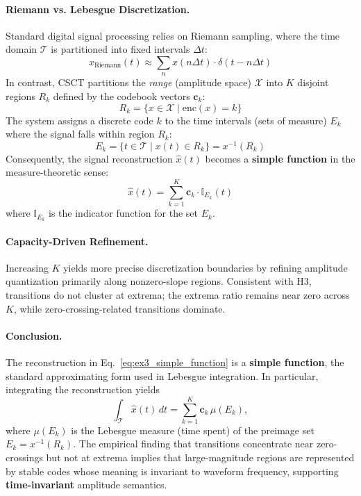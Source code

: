 \documentclass{article}
\begin{document}
\paragraph{Riemann vs. Lebesgue Discretization.}
Standard digital signal processing relies on Riemann sampling, where the time domain $\mathcal{T}$ is partitioned into fixed intervals $\Delta t$:
\begin{equation}
    x_{\text{Riemann}}(t) \approx \sum_{n} x(n\Delta t) \cdot \delta(t - n\Delta t)
\label{eq:ex3_riemann}
\end{equation}
In contrast, CSCT partitions the \textit{range} (amplitude space) $\mathcal{X}$ into $K$ disjoint regions $R_k$ defined by the codebook vectors $\mathbf{c}_k$:
\begin{equation}
    R_k = \{ x \in \mathcal{X} \mid \text{enc}(x) = k \}
\label{eq:ex3_range_partition}
\end{equation}
The system assigns a discrete code $k$ to the time intervals (sets of measure) $E_k$ where the signal falls within region $R_k$:
\begin{equation}
    E_k = \{ t \in \mathcal{T} \mid x(t) \in R_k \} = x^{-1}(R_k)
\label{eq:ex3_time_preimage}
\end{equation}
Consequently, the signal reconstruction $\hat{x}(t)$ becomes a \textbf{simple function} in the measure-theoretic sense:
\begin{equation}
    \hat{x}(t) = \sum_{k=1}^{K} \mathbf{c}_k \cdot \mathbb{I}_{E_k}(t)
\label{eq:ex3_simple_function}
\end{equation}
where $\mathbb{I}_{E_k}$ is the indicator function for the set $E_k$.

\paragraph{Capacity-Driven Refinement.}
Increasing $K$ yields more precise discretization boundaries by refining amplitude quantization primarily along nonzero-slope regions. Consistent with H3, transitions do not cluster at extrema; the extrema ratio remains near zero across $K$, while zero-crossing-related transitions dominate.

\paragraph{Conclusion.}
The reconstruction in Eq.~\eqref{eq:ex3_simple_function} is a \textbf{simple function}, the standard approximating form used in Lebesgue integration.
In particular, integrating the reconstruction yields
\[
\int_{\mathcal{T}} \hat{x}(t)\,dt = \sum_{k=1}^{K} \mathbf{c}_k \,\mu(E_k),
\]
where $\mu(E_k)$ is the Lebesgue measure (time spent) of the preimage set $E_k = x^{-1}(R_k)$.
The empirical finding that transitions concentrate near zero-crossings but not at extrema implies that large-magnitude regions are represented by stable codes whose meaning is invariant to waveform frequency, supporting \textbf{time-invariant} amplitude semantics.
\end{document}
